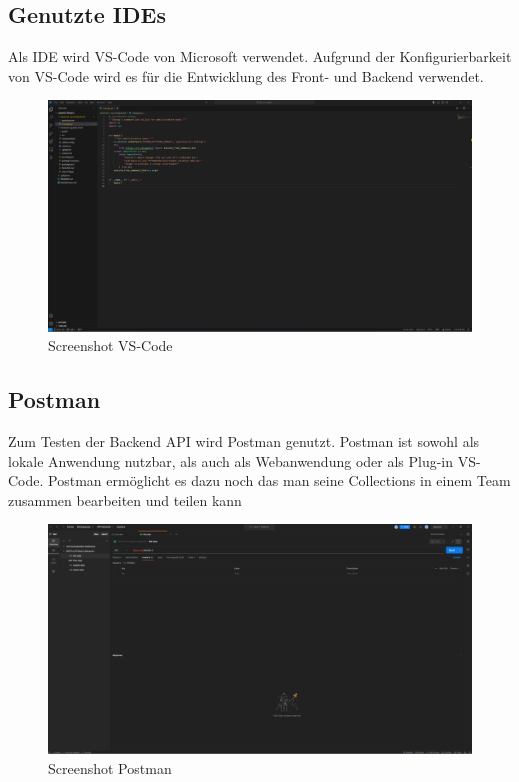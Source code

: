 \documentclass{article}
\begin{document}
\subsection{Genutzte IDEs}
Als IDE wird VS-Code von Microsoft verwendet. Aufgrund der Konfigurierbarkeit
von VS-Code wird es für die Entwicklung des Front- und Backend verwendet.

\begin{figure}[h]
    \centering
    \includegraphics[width= \textwidth]{images/VS-Code.png}
    \caption{Screenshot VS-Code}
    \label{fig:beispiel}
\end{figure}
\subsection{Postman}
Zum Testen der Backend API wird Postman genutzt. Postman ist sowohl als lokale
Anwendung nutzbar, als auch als Webanwendung oder als Plug-in VS-Code. Postman
ermöglicht es dazu noch das man seine Collections in einem Team zusammen
bearbeiten und teilen kann

\begin{figure}[h]
    \centering
    \includegraphics[width= \textwidth]{images/Postman.png}
    \caption{Screenshot Postman}
    \label{fig:beispiel}
\end{figure}
\end{document}
